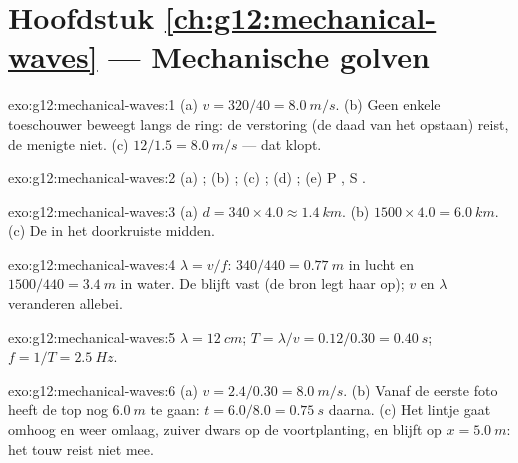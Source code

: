 \section*{Hoofdstuk \ref{ch:g12:mechanical-waves} --- Mechanische golven}

\begin{solution}{exo:g12:mechanical-waves:1}
(a) $v = 320/40 = \qty{8.0}{m/s}$. (b) Geen enkele toeschouwer beweegt
langs de ring: de verstoring (de daad van het opstaan) reist, de menigte
niet. (c) $12/1.5 = \qty{8.0}{m/s}$ --- dat klopt.
\end{solution}

\begin{solution}{exo:g12:mechanical-waves:2}
(a) ; (b) ; (c) ; (d) ;
(e) P , S .
\end{solution}

\begin{solution}{exo:g12:mechanical-waves:3}
(a) $d = 340 \times 4.0 \approx \qty{1.4}{km}$.
(b) $1500 \times 4.0 = \qty{6.0}{km}$. (c) De  in
het doorkruiste midden.
\end{solution}

\begin{solution}{exo:g12:mechanical-waves:4}
$\lambda = v/f$: $340/440 = \qty{0.77}{m}$ in lucht en
$1500/440 = \qty{3.4}{m}$ in water. De  blijft vast (de bron
legt haar op); $v$ en $\lambda$ veranderen allebei.
\end{solution}

\begin{solution}{exo:g12:mechanical-waves:5}
$\lambda = \qty{12}{cm}$; $T = \lambda/v = 0.12/0.30 = \qty{0.40}{s}$;
$f = 1/T = \qty{2.5}{Hz}$.
\end{solution}

\begin{solution}{exo:g12:mechanical-waves:6}
(a) $v = 2.4/0.30 = \qty{8.0}{m/s}$. (b) Vanaf de eerste foto heeft de
top nog $\qty{6.0}{m}$ te gaan: $t = 6.0/8.0 = \qty{0.75}{s}$ daarna.
(c) Het lintje gaat omhoog en weer omlaag, zuiver dwars op de
voortplanting, en blijft op $x = \qty{5.0}{m}$: het touw reist niet mee.
\end{solution}

